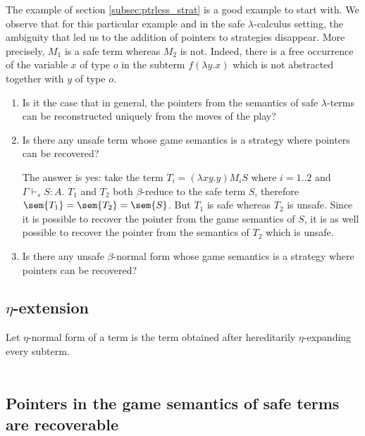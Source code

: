 \documentclass{article}
\begin{document}
The example of section \ref{subsec:ptrless_strat} is a good example to start with. We observe that for this particular example and in the safe $\lambda$-calculus setting,
the ambiguity that led us to the addition of pointers to strategies disappear.
More precisely, $M_1$ is a safe term whereas $M_2$ is not. Indeed, there is a free occurrence of the variable $x$ of type $o$ in the subterm $f (\lambda y . x)$
which is not abstracted together with $y$ of type $o$.


\begin{enumerate}
\item
Is it the case that in general, the pointers from the semantics of
safe $\lambda$-terms can be reconstructed uniquely from the moves of
the play?


\item
Is there any unsafe term whose game semantics is a strategy where
pointers can be recovered?

The answer is yes: take the term $T_i = (\lambda x y . y) M_i S$
where $i =1..2$ and $\Gamma \vdash_s S : A$. $T_1$ and $T_2$ both
$\beta$-reduce to the safe term $S$, therefore
$\sem{T_1}=\sem{T_2}=\sem{S}$. But $T_1$ is safe whereas $T_2$ is
unsafe. Since it is possible to recover the pointer from the game
semantics of $S$, it is as well possible to recover the pointer from
the semantics of $T_2$ which is unsafe.

\item
Is there any unsafe $\beta$-normal form whose game semantics is a
strategy where pointers can be recovered?


\end{enumerate}


\subsection{$\eta$-extension}

Let $\eta$-normal form of a term is the term obtained after hereditarily $\eta$-expanding every subterm.

\def\etanfaux#1{\lceil#1 \rceil}
\def\etanf#1{\eta-nf\left( #1 \right)}

\begin{eqnarray*}
\end{eqnarray*}

\subsection{Pointers in the game semantics of safe terms are recoverable}
\end{document}
